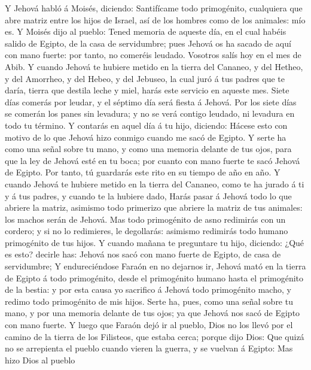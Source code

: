  Y Jehová habló á Moisés, diciendo: 
Santifícame todo primogénito, cualquiera que abre matriz entre los hijos
de Israel, así de los hombres como de los animales: mío es.
 Y Moisés dijo al pueblo: Tened memoria de aqueste día, en
el cual habéis salido de Egipto, de la casa de servidumbre; pues Jehová
os ha sacado de aquí con mano fuerte: por tanto, no comeréis leudado.
 Vosotros salís hoy en el mes de Abib.  Y
cuando Jehová te hubiere metido en la tierra del Cananeo, y del Hetheo,
y del Amorrheo, y del Hebeo, y del Jebuseo, la cual juró á tus padres
que te daría, tierra que destila leche y miel, harás este servicio en
aqueste mes.  Siete días comerás por leudar, y el séptimo
día será fiesta á Jehová.  Por los siete días se comerán
los panes sin levadura; y no se verá contigo leudado, ni levadura en
todo tu término.  Y contarás en aquel día á tu hijo,
diciendo: Hácese esto con motivo de lo que Jehová hizo conmigo cuando me
sacó de Egipto.  Y serte ha como una señal sobre tu mano,
y como una memoria delante de tus ojos, para que la ley de Jehová esté
en tu boca; por cuanto con mano fuerte te sacó Jehová de Egipto.
 Por tanto, tú guardarás este rito en su tiempo de año en
año.  Y cuando Jehová te hubiere metido en la tierra del
Cananeo, como te ha jurado á ti y á tus padres, y cuando te la hubiere
dado,  Harás pasar á Jehová todo lo que abriere la
matriz, asimismo todo primerizo que abriere la matriz de tus animales:
los machos serán de Jehová.  Mas todo primogénito de asno
redimirás con un cordero; y si no lo redimieres, le degollarás: asimismo
redimirás todo humano primogénito de tus hijos.  Y cuando
mañana te preguntare tu hijo, diciendo: ¿Qué es esto? decirle has:
Jehová nos sacó con mano fuerte de Egipto, de casa de servidumbre;
 Y endureciéndose Faraón en no dejarnos ir, Jehová mató
en la tierra de Egipto á todo primogénito, desde el primogénito humano
hasta el primogénito de la bestia: y por esta causa yo sacrifico á
Jehová todo primogénito macho, y redimo todo primogénito de mis hijos.
 Serte ha, pues, como una señal sobre tu mano, y por una
memoria delante de tus ojos; ya que Jehová nos sacó de Egipto con mano
fuerte.  Y luego que Faraón dejó ir al pueblo, Dios no
los llevó por el camino de la tierra de los Filisteos, que estaba cerca;
porque dijo Dios: Que quizá no se arrepienta el pueblo cuando vieren la
guerra, y se vuelvan á Egipto:  Mas hizo Dios al pueblo
